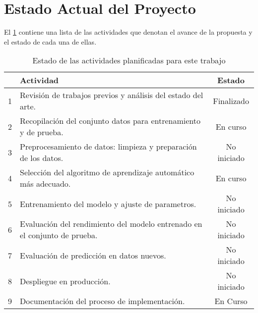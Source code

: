 \section{Estado Actual del Proyecto}

El \ref{table:4} contiene una lista de las actividades que denotan el avance de la propuesta y el estado de cada una de
ellas.

\begin{center}
    \vspace{-\topsep}
    \begin{table}[h!]
        \begin{tabular}{ |c|l|c| }
            \hline
            & \bf Actividad & \bf Estado \\
            \hline
            1 & Revisión de trabajos previos y análisis del estado del arte. & Finalizado \\
            \hline
            2 & Recopilación del conjunto datos para entrenamiento y de prueba. & En curso \\
            \hline
            3 & Preprocesamiento de datos: limpieza y preparación de los datos. & No iniciado \\
            \hline
            4 & Selección del algoritmo de aprendizaje automático más adecuado. & En curso \\
            \hline
            5 & Entrenamiento del modelo y ajuste de parametros. & No iniciado \\
            \hline
            6 & Evaluación del rendimiento del modelo entrenado en el conjunto de prueba. & No iniciado \\
            \hline
            7 & Evaluación de predicción en datos nuevos. & No iniciado \\
            \hline
            8 & Despliegue en producción. & No iniciado \\
            \hline
            9 & Documentación del proceso de implementación. & En Curso \\
            \hline
        \end{tabular}
        \caption{Estado de las actividades planificadas para este trabajo}
        \label{table:4}
    \end{table}
    \vspace{-\topsep}
\end{center}

